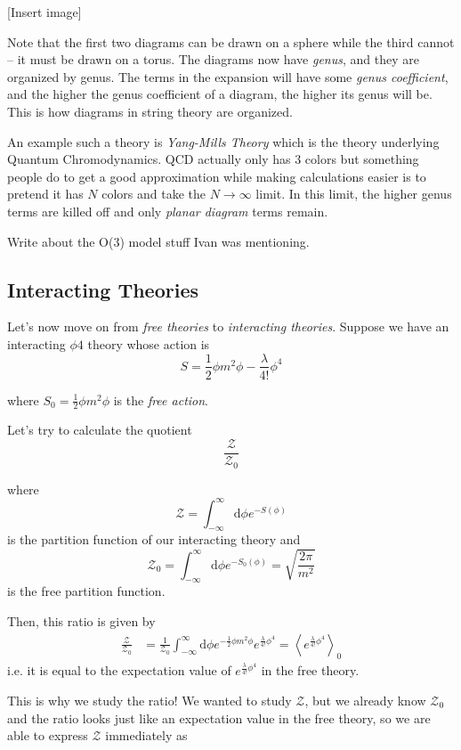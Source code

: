 \documentclass{article}
\newcommand{\cZ}{\mathcal{Z}}
\newcommand{\mean}[1]{\left\langle #1 \right\rangle}
\begin{document}
\vskip 0.25cm
[Insert image]

\vskip 0.25cm
Note that the first two diagrams can be drawn on a sphere while the third cannot -- it must be drawn on a torus. The diagrams now have \emph{genus}, and they are organized by genus. The terms in the expansion will have some \emph{genus coefficient}, and the higher the genus coefficient of a diagram, the higher its genus will be. This is how diagrams in string theory are organized.

\vskip 0.5cm
An example such a theory is \emph{Yang-Mills Theory} which is the theory underlying Quantum Chromodynamics. QCD actually only has 3 colors but something people do to get a good approximation while making calculations easier is to pretend it has $N$ colors and take the $N \rightarrow \infty$ limit. In this limit, the higher genus terms are killed off and only \emph{planar diagram} terms remain.

\vskip 0.5cm
Write about the O(3) model stuff Ivan was mentioning.

\vskip 1cm
\subsection{Interacting Theories}
Let's now move on from \emph{free theories} to \emph{interacting theories}. Suppose we have an interacting $\phi4$ theory whose  action is 
\[ S = \frac{1}{2} \phi m^2 \phi - \frac{\lambda}{4!} \phi^4 \]

where $S_0 = \frac{1}{2}\phi m^2 \phi$ is the \emph{free action}. 

\vskip 1cm
Let's try to calculate the quotient 
\[ \frac{\cZ}{\cZ_0} \]

where 
\[ \cZ = \int_{-\infty}^{\infty} \mathrm{d}\phi e^{-S(\phi)} \] is the partition function of our interacting theory and 
\[ \cZ_0 = \int_{-\infty}^{\infty} \mathrm{d}\phi e^{-S_0(\phi)} = \sqrt{\frac{2\pi}{m^2}}\] is the free partition function.

Then, this ratio is given by 
\begin{align*}
  \frac{\cZ}{\cZ_0} &= \frac{1}{\cZ_0} \int_{-\infty}^{\infty} \mathrm{d}\phi e^{-\frac{1}{2}\phi m^2 \phi} e^{\frac{\lambda}{4!} \phi^4} = \mean{e^{\frac{\lambda}{4!} \phi^4}}_0
\end{align*}
i.e. it is equal to the expectation value of $e^{\frac{\lambda}{4!} \phi^4}$ in the free theory. 

\vskip 0.5cm
This is why we study the ratio! We wanted to study $\cZ$, but we already know $\cZ_0$ and the ratio looks just like an expectation value in the free theory, so we are able to express $\cZ$ immediately as
\end{document}
